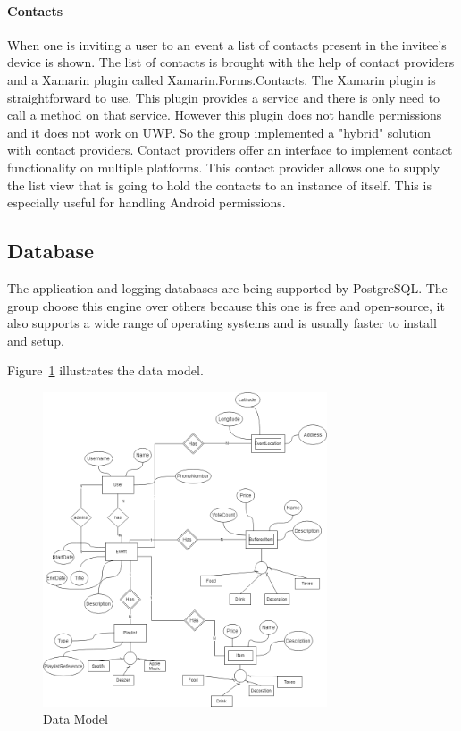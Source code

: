 \paragraph{Contacts}
When one is inviting a user to an event a list of contacts present in the invitee's device is shown. The list of contacts is brought with the help of contact providers and a Xamarin plugin called Xamarin.Forms.Contacts.
The Xamarin plugin is straightforward to use. This plugin provides a service and there is only need to call a method on that service. However this plugin does not handle permissions and it does not work on UWP. So the group implemented a "hybrid" solution with contact providers.
Contact providers offer an interface to implement contact functionality on multiple platforms.
This contact provider allows one to supply the list view that is going to hold the contacts to an instance of itself. This is especially useful for handling Android permissions.


\newpage
\subsection{Database}

The application and logging databases are being supported by PostgreSQL. The group choose this engine over others because this one is free and open-source, it also supports a wide range of operating systems and is usually faster to install and setup.


Figure~\ref{fig:EAModel} illustrates the data model.

\begin{figure}[!ht]
	\centering
	\includegraphics[width=0.75\textwidth]{./Chapter3/Figures/EventDatabase.png}
	\caption{Data Model}
	\label{fig:EAModel}
\end{figure}


